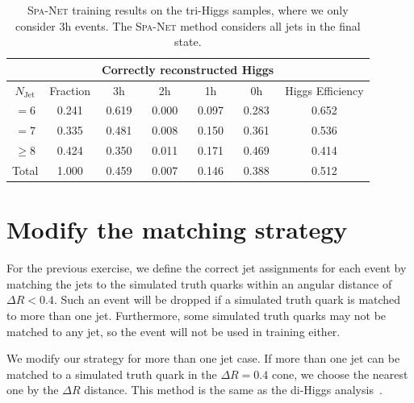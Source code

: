 \documentclass[12pt]{article}
\begin{document}
    \begin{table}[htpb]
        \centering
        \caption{\textsc{Spa-Net} training results on the tri-Higgs samples, where we only consider 3h events. The \textsc{Spa-Net} method considers all jets in the final state.}
        \label{tab:SPANet_triHiggs_3h_new}
        \begin{tabular}{c|c|cccc|c}
            \multicolumn{1}{l|}{} &          & \multicolumn{4}{c|}{Correctly reconstructed Higgs} & \multicolumn{1}{l}{} \\ \hline
            $N_\text{Jet}$        & Fraction & 3h          & 2h         & 1h         & 0h         & Higgs Efficiency     \\ \hline
            $=6$                  & 0.241    & 0.619 & 0.000 & 0.097 & 0.283 &  0.652                \\
            $=7$                  & 0.335    & 0.481 & 0.008 & 0.150 & 0.361 &  0.536                \\
            $\ge 8$               & 0.424    & 0.350 & 0.011 & 0.171 & 0.469 &  0.414                \\ \hline
            Total                 & 1.000    & 0.459 & 0.007 & 0.146 & 0.388 &  0.512
        \end{tabular}
    \end{table}
\section{Modify the matching strategy}%
\label{sec:modify_the_matching_strategy}
    For the previous exercise, we define the correct jet assignments for each event by matching the jets to the simulated truth quarks within an angular distance of $\Delta R < 0.4$. Such an event will be dropped if a simulated truth quark is matched to more than one jet. Furthermore, some simulated truth quarks may not be matched to any jet, so the event will not be used in training either.

    We modify our strategy for more than one jet case. If more than one jet can be matched to a simulated truth quark in the $\Delta R=0.4$ cone, we choose the nearest one by the $\Delta R$ distance. This method is the same as the di-Higgs analysis~\cite{Stanislaus:2020vfx}.
\end{document}
